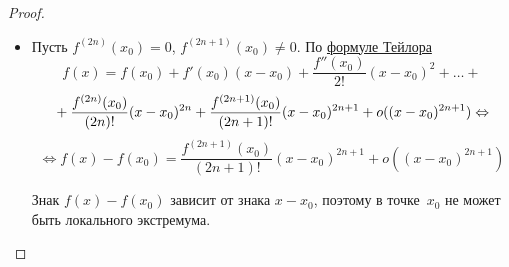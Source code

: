 \begin{enumerate}
\begin{proof}
\begin{itemize}
		\item Пусть $f^{(2n)}(x_0) = 0$, $f^{(2n+1)}(x_0) \neq 0$.
		По \hyperref[eq:Taylor_series]{формуле Тейлора}
		\begin{equation*}
		f(x) = f(x_0) + f'(x_0)(x - x_0) + \frac{f''(x_0)}{2!} (x - x_0)^2 + \ldots +
		\end{equation*}
		\begin{equation*}
		\vphantom1 + \frac{f^{(2n)}(x_0)}{(2n)!} (x - x_0)^{2n} + \frac{f^{(2n+1)}(x_0)}{(2n+1)!} (x - x_0)^{2n+1} + o((x - x_0)^{2n+1}) \Leftrightarrow
		\end{equation*}
		\begin{equation*}
		\Leftrightarrow f(x) - f(x_0) = \frac{f^{(2n+1)}(x_0)}{(2n+1)!} (x - x_0)^{2n+1} + o((x - x_0)^{2n+1})
		\end{equation*}
		
		Знак $f(x) - f(x_0)$ зависит от знака $x - x_0$, поэтому в точке~$x_0$ не может быть локального экстремума.
	\end{itemize}
	\end{proof}
\end{enumerate}